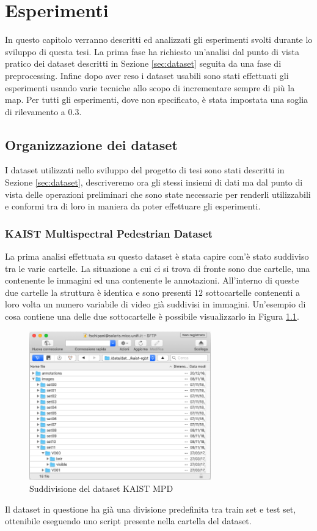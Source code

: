 \chapter{Esperimenti}
\label{chap:experiment}
In questo capitolo verranno descritti ed analizzati gli esperimenti svolti durante lo sviluppo di questa tesi. La prima fase ha richiesto un'analisi dal punto di vista pratico dei dataset descritti in Sezione \ref{sec:dataset} seguita da una fase di preprocessing. 
Infine dopo aver reso i dataset usabili sono stati effettuati gli esperimenti usando varie tecniche allo scopo di incrementare sempre di più la \acl{map}. Per tutti gli esperimenti, dove non specificato, è stata impostata una soglia di rilevamento a $0.3$.
\section{Organizzazione dei dataset}
\label{sec:dataset_org}
I dataset utilizzati nello sviluppo del progetto di tesi sono stati descritti in Sezione \ref{sec:dataset}, descriveremo ora gli stessi insiemi di dati ma dal punto di vista delle operazioni preliminari che sono state necessarie per renderli utilizzabili e conformi tra di loro in maniera da poter effettuare gli esperimenti. 
\subsection{KAIST Multispectral Pedestrian Dataset}
\label{subsec:kaist_experiment}
La prima analisi effettuata su questo dataset è stata capire com'è stato suddiviso tra le varie cartelle. La situazione a cui ci si trova di fronte sono due cartelle, una contenente le immagini ed una contenente le annotazioni. All'interno di queste due cartelle la struttura è identica e sono presenti $12$ sottocartelle contenenti a loro volta un numero variabile di video già suddivisi in immagini. Un'esempio di cosa contiene una delle due sottocartelle è possibile visualizzarlo in Figura \ref{fig:kaist_dataset_folder}.
\begin{figure}
    \centering
    \includegraphics[width=0.7\textwidth]{images/screen_kaist.png}
    \caption{Suddivisione del dataset KAIST MPD}
    \label{fig:kaist_dataset_folder}
\end{figure} 
Il dataset in questione ha già una divisione predefinita tra train set e test set, ottenibile eseguendo uno script presente nella cartella del dataset. 

